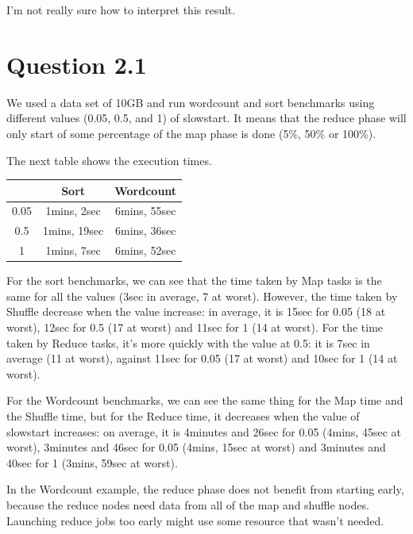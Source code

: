 \documentclass{article}
\begin{document}
I'm not really sure how to interpret this result.

\section*{Question 2.1}


We used a data set of 10GB and run wordcount and sort benchmarks using
different values (0.05, 0.5, and 1) of slowstart.
It means that the reduce phase will only start of some percentage of the map phase is done (5\%, 50\% or 100\%).

The next table shows the execution times.

\begin{center}
\begin{tabular}{|c|c|c|}
\hline
\ & Sort & Wordcount \\
\hline
0.05 & 1mins, 2sec & 6mins, 55sec \\
\hline
0.5 & 1mins, 19sec & 6mins, 36sec \\
\hline
1 & 1mins, 7sec & 6mins, 52sec \\
\hline
\end{tabular}
\end{center}

For the sort benchmarks, we can see that the time taken by Map tasks is the same for all the values (3sec in average, 7 at worst).
However, the time taken by Shuffle decrease when the value increase: in average, it is 15sec for 0.05 (18 at worst), 12sec for 0.5 (17 at worst) and 11sec for 1 (14 at worst). For the time taken by Reduce tasks, it's more quickly with the value at 0.5: it is 7sec in average (11 at worst), against 11sec for 0.05 (17 at worst) and 10sec for 1 (14 at worst).

For the Wordcount benchmarks, we can see the same thing for the Map time and the Shuffle time, but for the Reduce time, it decreases when the value of slowstart increases: on average, it is 4minutes and 26sec for 0.05 (4mins, 45sec at worst), 3minutes and 46sec for 0.05 (4mins, 15sec at worst) and 3minutes and 40sec for 1 (3mins, 59sec at worst).

In the Wordcount example, the reduce phase does not benefit from starting early, because the reduce nodes need data from all of the map and shuffle nodes. Launching reduce jobs too early might use some resource that wasn't needed. 
\end{document}
